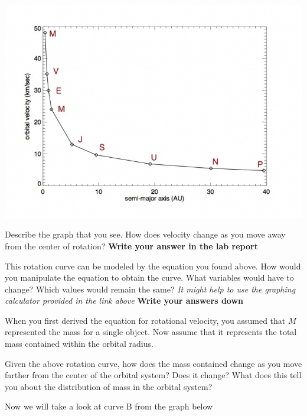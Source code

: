 \includegraphics[scale = .7]{srt-background-rotation/keplerian-orbit.jpg}

\begin{steps}
	\item Describe the graph  that you see. How does velocity change as you move away from the center of rotation? \textbf{Write your answer in the lab report}
	
	\item This rotation curve can be modeled by the equation you found above. How would you manipulate the equation to obtain the curve. What variables would have to change? Which values would remain the same? \textit{It might help  to use the graphing calculator provided in the link above} \textbf{Write your answers down}
	
\end{steps} 

When you first derived the equation for rotational velocity, you assumed that $M$ represented the mass for a single object. Now assume that it represents the total mass contained within the orbital radius. 

\begin{steps}
	\item Given the above rotation curve, how does the mass contained change as you move farther from the center of the orbital system? Does it change? What does this tell you about the distribution of mass in the orbital system?
\end{steps}

Now we will take a look at curve B from the graph below
	

